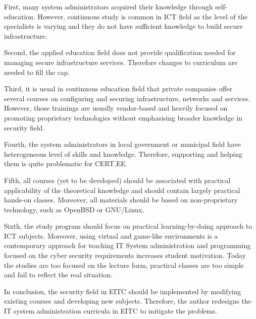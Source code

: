 First, many system administrators acquired their knowledge through self-education. However, continuous study is common in \gls{ICT} field as the level of the specialists is varying and they do not have sufficient knowledge to build secure infrastructure.

Second, the applied education field does not provide qualification needed for managing secure infrastructure services. Therefore changes to curriculum are needed to fill the cap.

Third, it is usual in continuous education field that private companies offer several courses on configuring and securing infrastructure, networks and services. However, those trainings are usually vendor-based and heavily focused on promoting proprietary technologies without emphasising broader knowledge in security field.

Fourth, the system administrators in local government or municipal field have heterogeneous level of skills and knowledge. Therefore, supporting and helping them is quite problematic for \gls{CERT.EE}.

Fifth, all courses (yet to be developed) should be associated with practical applicability of the theoretical knowledge and should contain largely practical hands-on classes. Moreover, all materials should be based on non-proprietary technology, such as \gls{OpenBSD} or \gls{GNU/Linux}.

Sixth, the study program should focus on practical learning-by-doing approach to \gls{ICT} subjects.
 Moreover, using virtual and game-like environments is a contemporary approach for teaching IT System administration and programming focused on the cyber security requirements increases student motivation. Today the studies are too focused on the lecture form, practical classes are too simple and fail to reflect the real situation.

 
In conclusion, the security field in \gls{EITC} should be implemented by modifying existing courses and developing new subjects. Therefore, the author redesigns the IT system administration curricula in \gls{EITC} to mitigate the problems.



